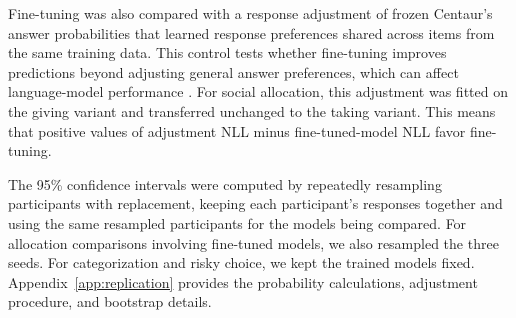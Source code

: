 Fine-tuning was also compared with a response adjustment of frozen Centaur's answer probabilities that learned response preferences shared across items from the same training data. This control tests whether fine-tuning improves predictions beyond adjusting general answer preferences, which can affect language-model performance \citep{zhao2021calibrate}. For social allocation, this adjustment was fitted on the giving variant and transferred unchanged to the taking variant. This means that positive values of adjustment NLL minus fine-tuned-model NLL favor fine-tuning.

The 95\% confidence intervals were computed by repeatedly resampling participants with replacement, keeping each participant’s responses together and using the same resampled participants for the models being compared. For allocation comparisons involving fine-tuned models, we also resampled the three seeds. For categorization and risky choice, we kept the trained models fixed. Appendix~\ref{app:replication} provides the probability calculations, adjustment procedure, and bootstrap details.
